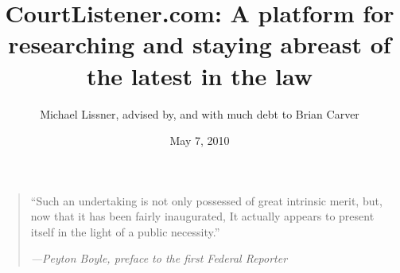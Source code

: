 \documentclass[11pt]{article}
\begin{document}
\title{CourtListener.com: A platform for researching and staying abreast of the latest in the law}

\author{Michael Lissner, advised by, and with much debt to Brian Carver}
\date{May 7, 2010}
\maketitle
\begin{quote}
``Such an undertaking is not only possessed of great intrinsic merit, but, now that it has been fairly inaugurated, It actually appears to present itself in the light of a public necessity.''

     \hspace*{10mm}\emph{---Peyton Boyle, preface to the first Federal Reporter}
\end{quote}


\vspace{20mm}
\tableofcontents
\clearpage








\clearpage

%
%
\end{document}
